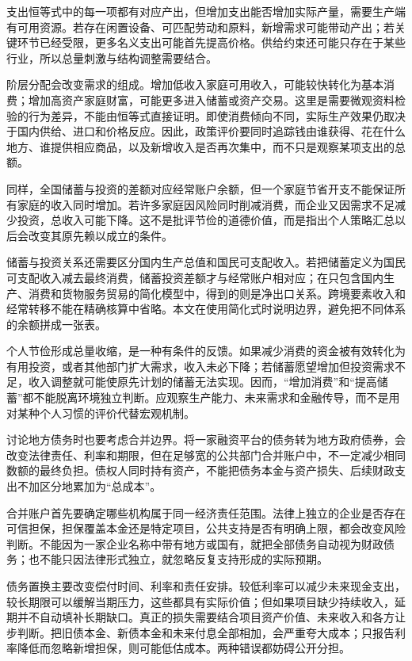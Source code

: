 \documentclass[UTF8,fontset=fandol,zihao=-4,oneside,openany]{ctexbook}
\begin{document}
\label{arg:P031}
支出恒等式中的每一项都有对应产出，但增加支出能否增加实际产量，需要生产端有可用资源。若存在闲置设备、可匹配劳动和原料，新增需求可能带动产出；若关键环节已经受限，更多名义支出可能首先提高价格。供给约束还可能只存在于某些行业，所以总量刺激与结构调整需要结合。

阶层分配会改变需求的组成。增加低收入家庭可用收入，可能较快转化为基本消费；增加高资产家庭财富，可能更多进入储蓄或资产交易。这里是需要微观资料检验的行为差异，不能由恒等式直接证明。即使消费倾向不同，实际生产效果仍取决于国内供给、进口和价格反应。因此，政策评价要同时追踪钱由谁获得、花在什么地方、谁提供相应商品，以及新增收入是否再次集中，而不只是观察某项支出的总额。

同样，全国储蓄与投资的差额对应经常账户余额，但一个家庭节省开支不能保证所有家庭的收入同时增加。若许多家庭因风险同时削减消费，而企业又因需求不足减少投资，总收入可能下降。这不是批评节俭的道德价值，而是指出个人策略汇总以后会改变其原先赖以成立的条件。

\label{arg:P032}
储蓄与投资关系还需要区分国内生产总值和国民可支配收入。若把储蓄定义为国民可支配收入减去最终消费，储蓄投资差额才与经常账户相对应；在只包含国内生产、消费和货物服务贸易的简化模型中，得到的则是净出口关系。跨境要素收入和经常转移不能在精确核算中省略。本文在使用简化式时说明边界，避免把不同体系的余额拼成一张表。

个人节俭形成总量收缩，是一种有条件的反馈。如果减少消费的资金被有效转化为有用投资，或者其他部门扩大需求，收入未必下降；若储蓄愿望增加但投资需求不足，收入调整就可能使原先计划的储蓄无法实现。因而，“增加消费”和“提高储蓄”都不能脱离环境独立判断。应观察生产能力、未来需求和金融传导，而不是用对某种个人习惯的评价代替宏观机制。

讨论地方债务时也要考虑合并边界。将一家融资平台的债务转为地方政府债券，会改变法律责任、利率和期限，但在足够宽的公共部门合并账户中，不一定减少相同数额的最终负担。债权人同时持有资产，不能把债务本金与资产损失、后续财政支出不加区分地累加为“总成本”。

\label{arg:P033}
合并账户首先要确定哪些机构属于同一经济责任范围。法律上独立的企业是否存在可信担保，担保覆盖本金还是特定项目，公共支持是否有明确上限，都会改变风险判断。不能因为一家企业名称中带有地方或国有，就把全部债务自动视为财政债务；也不能只因法律形式独立，就忽略反复支持形成的实际预期。

债务置换主要改变偿付时间、利率和责任安排。较低利率可以减少未来现金支出，较长期限可以缓解当期压力，这些都具有实际价值；但如果项目缺少持续收入，延期并不自动填补长期缺口。真正的损失需要结合项目资产价值、未来收入和各方让步判断。把旧债本金、新债本金和未来付息全部相加，会严重夸大成本；只报告利率降低而忽略新增担保，则可能低估成本。两种错误都妨碍公开分担。
\end{document}
